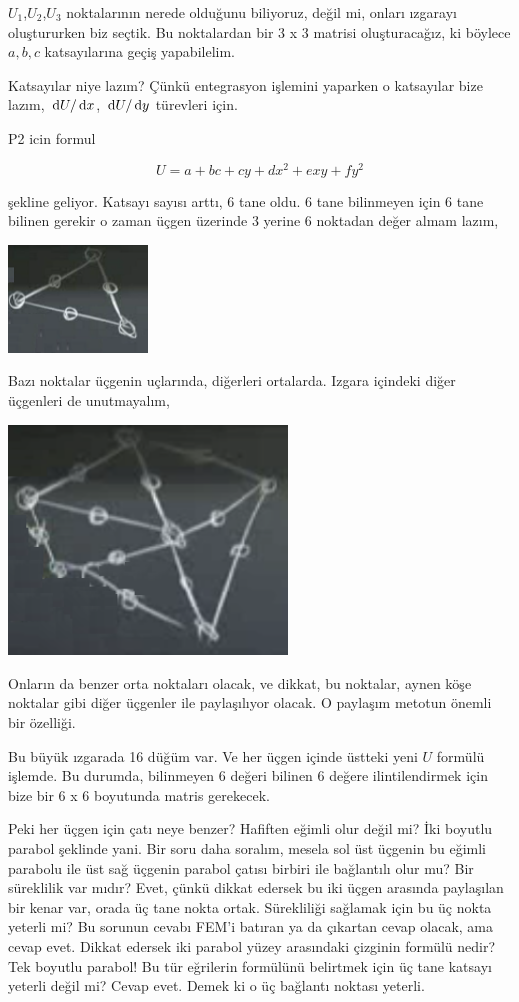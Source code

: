 \documentclass[12pt,fleqn]{article}\usepackage{../../common}
\begin{document}
$U_1$,$U_2$,$U_3$ noktalarının nerede olduğunu biliyoruz, değil mi, onları
ızgarayı oluştururken biz seçtik. Bu noktalardan bir 3 x 3 matrisi
oluşturacağız, ki böylece $a,b,c$ katsayılarına geçiş yapabilelim.

Katsayılar niye lazım? Çünkü entegrasyon işlemini yaparken o katsayılar bize
lazım, $\,\mathrm{d} U / \,\mathrm{d} x$, $\,\mathrm{d} U / \,\mathrm{d} y$ türevleri için. 

P2 icin formul

$$
U = a + bc + cy + dx^2 + exy + fy^2
$$

şekline geliyor. Katsayı sayısı arttı, 6 tane oldu. 6 tane bilinmeyen için 6
tane bilinen gerekir o zaman üçgen üzerinde 3 yerine 6 noktadan değer almam
lazım, 

\includegraphics[width=10em]{compscieng_1_27_05.png}

Bazı noktalar üçgenin uçlarında, diğerleri ortalarda. Izgara içindeki diğer
üçgenleri de unutmayalım, 

\includegraphics[width=20em]{compscieng_1_27_06.png}

Onların da benzer orta noktaları olacak, ve dikkat, bu noktalar, aynen köşe
noktalar gibi diğer üçgenler ile paylaşılıyor olacak. O paylaşım metotun
önemli bir özelliği.

Bu büyük ızgarada 16 düğüm var. Ve her üçgen içinde üstteki yeni $U$ formülü
işlemde. Bu durumda, bilinmeyen 6 değeri bilinen 6 değere ilintilendirmek için
bize bir 6 x 6 boyutunda matris gerekecek.

Peki her üçgen için çatı neye benzer?  Hafiften eğimli olur değil mi? İki
boyutlu parabol şeklinde yani. Bir soru daha soralım, mesela sol üst
üçgenin bu eğimli parabolu ile üst sağ üçgenin parabol çatısı birbiri ile
bağlantılı olur mu? Bir süreklilik var mıdır? Evet, çünkü dikkat edersek
bu iki üçgen arasında paylaşılan bir kenar var, orada üç tane nokta ortak.
Sürekliliği sağlamak için bu üç nokta yeterli mi? Bu sorunun cevabı FEM'i
batıran ya da çıkartan cevap olacak, ama cevap evet. Dikkat edersek
iki parabol yüzey arasındaki çizginin formülü nedir? Tek boyutlu parabol!
Bu tür eğrilerin formülünü belirtmek için üç tane katsayı yeterli değil mi?
Cevap evet. Demek ki o üç bağlantı noktası yeterli.
\end{document}

